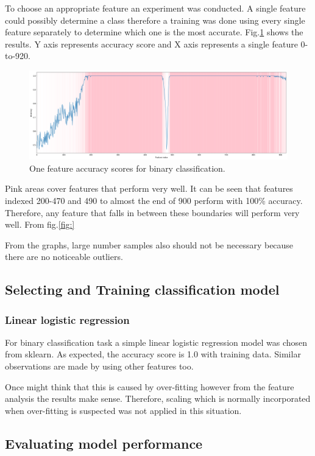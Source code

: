 \documentclass[11pt]{article}
\begin{document}
		To choose an appropriate feature an experiment was conducted. A single feature could possibly determine a class therefore a training was done using every single feature separately to determine which one is the most accurate. Fig.\ref{fig:binary_one} shows the results. Y axis represents accuracy score and X axis represents a single feature 0-to-920. 

		\begin{figure}[H]
			\includegraphics[width=1\textwidth]{png/binary_one}
			\caption{One feature accuracy scores for binary classification.}
			\label{fig:binary_one}
		\end{figure}

		Pink areas cover features that perform very well. It can be seen that features indexed 200-470 and 490 to almost the end of 900 perform with 100\% accuracy. Therefore, any feature that falls in between these boundaries will perform very well. From fig.\ref{fig:}

		From the graphs, large number samples also should not be necessary because there are no noticeable outliers. 

	\subsection{Selecting and Training classification model}
		\subsubsection{Linear logistic regression}
			For binary classification task a simple linear logistic regression model was chosen from sklearn. As expected, the accuracy score is 1.0 with training data. Similar observations are made by using other features too. 

			Once might think that this is caused by over-fitting however from the feature analysis the results make sense. Therefore, scaling which is normally incorporated when over-fitting is suspected was not applied in this situation. 

	\subsection{Evaluating model performance}
\end{document}
